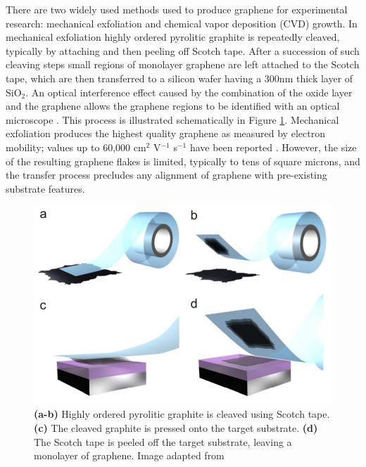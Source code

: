 \documentclass[edeposit,fullpage,draftthesis]{uiucthesis2009}
\begin{document}
            There are two widely used methods used to produce graphene for 
        experimental research: mechanical exfoliation\cite{novoselov2004electric} and chemical vapor
        deposition (CVD) growth\cite{li2009large}. In mechanical exfoliation highly ordered
        pyrolitic graphite is repeatedly cleaved, typically by attaching and 
        then peeling off Scotch tape. After a succession of such cleaving steps
        small regions of monolayer graphene are left attached to the Scotch
        tape, which are then transferred to a silicon wafer having a 300nm
        thick layer of SiO$_2$. An optical interference effect caused by the 
        combination of the oxide layer and the graphene allows the graphene
        regions to be identified with an optical microscope \cite{Blake2007}.
        This process is illustrated schematically in Figure \ref{fig:exfoliation}.
        Mechanical exfoliation produces the highest quality graphene as
        measured by electron mobility; values up to 60,000 cm$^2$ V$^{-1}$
        s$^{-1}$ have been reported \cite{Dean2010}. However, the size of the 
        resulting graphene flakes is limited, typically to tens of square
        microns, and the transfer process precludes any alignment of graphene
        with pre-existing substrate features.
        
            \begin{figure}
            \centering
            \includegraphics[width=0.6\linewidth]{images/experimentaltechniques/exfoliation.png}
            \caption[Mechanical exfoliation of graphene]{
                \textbf{(a-b)} Highly ordered pyrolitic graphite is cleaved using Scotch tape.
                \textbf{(c)} The cleaved graphite is pressed onto the target substrate.
                \textbf{(d)} The Scotch tape is peeled off the target substrate, leaving a monolayer of graphene.
                Image adapted from \cite{novoselov2012two}}
            \label{fig:exfoliation}
            \end{figure}
\end{document}
